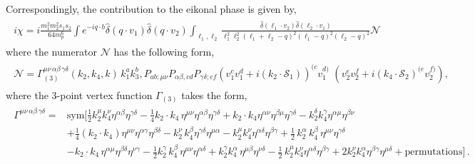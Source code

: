 Correspondingly, the contribution to the eikonal phase is given by,
\begin{align}
    \begin{split}
        i\chi=i\frac{m_1^2 m_2^2 s_1 s_2}{64 m_p^6}\int e^{-i q\cdot b}\hat\delta(q\cdot v_1)\hat\delta(q\cdot v_2)\int_{\ell_{1},\ell_{2}}\frac{\hat\delta(\ell_{1}\cdot v_2)\hat\delta(\ell_{2}\cdot v_1)}{\ell_{1}^2 \ell_{2}^2 (\ell_{1}+\ell_{2}-q)^2 (\ell_{1}-q)^2 (\ell_{2}-q)^2}\mathcal{N}\label{4.68j}
    \end{split}
\end{align}
where the numerator $\mathcal{N}$ has the following form,
\begin{align}
    \begin{split}
        \mathcal{N}= \Gamma_{(3)}^{\mu\nu\,\alpha\beta\,\gamma\delta}(k_2,k_4,k)\,k_1^a k_3^b,P_{a b;\mu\nu}P_{\alpha\beta,c d}P_{\gamma\delta;e f}(v_1^{c}v_1^d+i(k_2\cdot \mathcal{S}_1))^{(c}v_1^{d)}\,\,(v_2^{e}v_2^f+i(k_4\cdot \mathcal{S}_2)^{(e}v_2^{f)}),
    \end{split}
\end{align}
where the 3-point vertex function $\Gamma_{(3)}$ takes the form,
\begin{align}
    \begin{split}
    \Gamma^{\mu\nu\,\alpha\beta\,\gamma\delta}=&\textrm{sym}\Big[\frac{1}{2}k_{2}^\mu k_{4}^\nu\eta^{\alpha\beta}\eta^{\gamma\delta}-\frac{1}{4}k_2\cdot k_4\,\eta^{\mu\nu}\eta^{\alpha\beta}\eta^{\gamma\delta}+k_2\cdot k_4 \eta^{\alpha\nu}\eta^{\beta\mu}\eta^{\gamma\delta}-k_2^\delta k_4^\gamma \eta^{\alpha\mu}\eta^{\beta\nu}\\ &
        +\frac{1}{4}(k_2\cdot k_4)\eta^{\mu\nu}\eta^{\alpha\gamma}\eta^{\beta\delta}-k_2^\nu\,k_4^\beta \eta^{\gamma\delta}\eta^{\mu\alpha}-k_{2}^\mu k_4^\nu \eta^{\alpha\delta}\eta^{\beta\gamma}+\frac{1}{2}\,k_2^\alpha\,k_4^\beta\,\eta^{\mu\nu}\eta^{\gamma\delta}\\ &
        -k_2\cdot k_4\,\eta^{\alpha\mu}\eta^{\beta\delta}\eta^{\nu\gamma}-\frac{1}{2}k_2^\gamma\,k_4^\beta\,\eta^{\mu\nu}\eta^{\alpha\delta}+k_2^\gamma k_4^\alpha\,\eta^{\mu\beta}\eta^{\nu\delta}-\frac{1}{2}\,k_2^\mu k_4^\nu \eta^{\alpha\delta}\eta^{\beta \gamma}+2 k_{2}^\nu k_4^\alpha\eta^{\beta\gamma}\eta^{\mu\delta}+\textrm{permutations}\Big]\,.
    \end{split}
\end{align}
